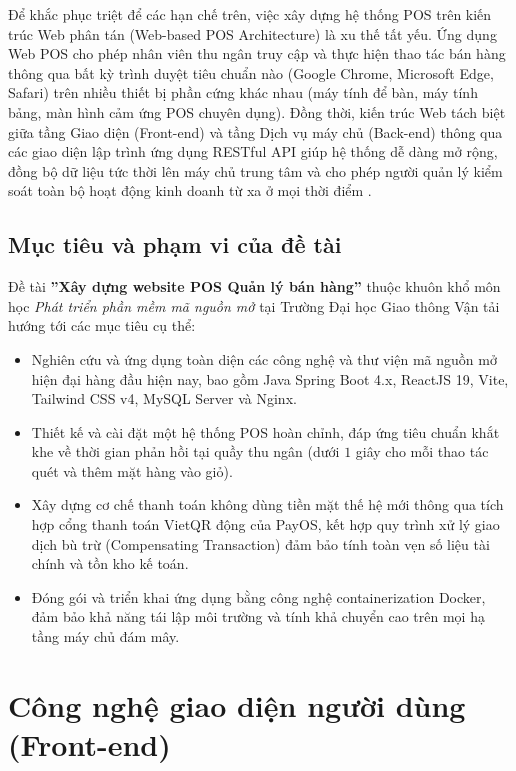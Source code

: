 Để khắc phục triệt để các hạn chế trên, việc xây dựng hệ thống POS trên kiến trúc Web phân tán (Web-based POS Architecture) là xu thế tất yếu. Ứng dụng Web POS cho phép nhân viên thu ngân truy cập và thực hiện thao tác bán hàng thông qua bất kỳ trình duyệt tiêu chuẩn nào (Google Chrome, Microsoft Edge, Safari) trên nhiều thiết bị phần cứng khác nhau (máy tính để bàn, máy tính bảng, màn hình cảm ứng POS chuyên dụng). Đồng thời, kiến trúc Web tách biệt giữa tầng Giao diện (Front-end) và tầng Dịch vụ máy chủ (Back-end) thông qua các giao diện lập trình ứng dụng RESTful API giúp hệ thống dễ dàng mở rộng, đồng bộ dữ liệu tức thời lên máy chủ trung tâm và cho phép người quản lý kiểm soát toàn bộ hoạt động kinh doanh từ xa ở mọi thời điểm \cite{sommerville2016}.

\subsection{Mục tiêu và phạm vi của đề tài}
Đề tài \textbf{''Xây dựng website POS Quản lý bán hàng''} thuộc khuôn khổ môn học \textit{Phát triển phần mềm mã nguồn mở} tại Trường Đại học Giao thông Vận tải hướng tới các mục tiêu cụ thể:
\begin{itemize}[leftmargin=1.5cm]
    \item Nghiên cứu và ứng dụng toàn diện các công nghệ và thư viện mã nguồn mở hiện đại hàng đầu hiện nay, bao gồm Java Spring Boot 4.x, ReactJS 19, Vite, Tailwind CSS v4, MySQL Server và Nginx.
    \item Thiết kế và cài đặt một hệ thống POS hoàn chỉnh, đáp ứng tiêu chuẩn khắt khe về thời gian phản hồi tại quầy thu ngân (dưới $1$ giây cho mỗi thao tác quét và thêm mặt hàng vào giỏ).
    \item Xây dựng cơ chế thanh toán không dùng tiền mặt thế hệ mới thông qua tích hợp cổng thanh toán VietQR động của PayOS, kết hợp quy trình xử lý giao dịch bù trừ (Compensating Transaction) đảm bảo tính toàn vẹn số liệu tài chính và tồn kho kế toán.
    \item Đóng gói và triển khai ứng dụng bằng công nghệ containerization Docker, đảm bảo khả năng tái lập môi trường và tính khả chuyển cao trên mọi hạ tầng máy chủ đám mây.
\end{itemize}

\section{Công nghệ giao diện người dùng (Front-end)}
\label{sec:cong_nghe_frontend}

